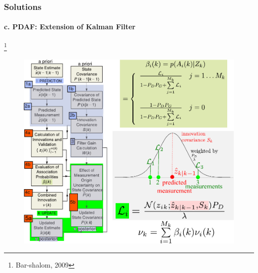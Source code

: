 \begin{frame}
\frametitle{Solutions}
\framesubtitle{c. PDAF: Extension of Kalman Filter}
\footnote{ \tiny Bar-shalom, 2009}
\mypagenum	
\begin{figure}
\includegraphics[height=0.7\textheight]{figs/TRK_PDAF_flowDiagram.pdf}
\end{figure}	
\end{frame}





